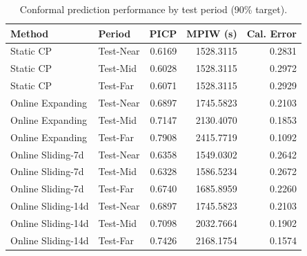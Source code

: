 \begin{table}
\caption{Conformal prediction performance by test period (90\% target).}
\label{tab:t52_performance_by_period}
\begin{tabular}{llrrr}
\toprule
Method & Period & PICP & MPIW (s) & Cal. Error \\
\midrule
Static CP & Test-Near & 0.6169 & 1528.3115 & 0.2831 \\
Static CP & Test-Mid & 0.6028 & 1528.3115 & 0.2972 \\
Static CP & Test-Far & 0.6071 & 1528.3115 & 0.2929 \\
Online Expanding & Test-Near & 0.6897 & 1745.5823 & 0.2103 \\
Online Expanding & Test-Mid & 0.7147 & 2130.4070 & 0.1853 \\
Online Expanding & Test-Far & 0.7908 & 2415.7719 & 0.1092 \\
Online Sliding-7d & Test-Near & 0.6358 & 1549.0302 & 0.2642 \\
Online Sliding-7d & Test-Mid & 0.6328 & 1586.5234 & 0.2672 \\
Online Sliding-7d & Test-Far & 0.6740 & 1685.8959 & 0.2260 \\
Online Sliding-14d & Test-Near & 0.6897 & 1745.5823 & 0.2103 \\
Online Sliding-14d & Test-Mid & 0.7098 & 2032.7664 & 0.1902 \\
Online Sliding-14d & Test-Far & 0.7426 & 2168.1754 & 0.1574 \\
\bottomrule
\end{tabular}
\end{table}
